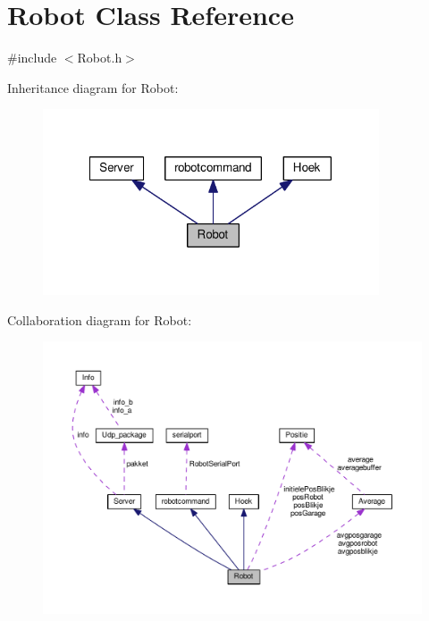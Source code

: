 \hypertarget{classRobot}{\section{Robot Class Reference}
\label{classRobot}
}


{\ttfamily \#include $<$Robot.\-h$>$}



Inheritance diagram for Robot\-:
\nopagebreak
\begin{figure}[H]
\begin{center}
\leavevmode
\includegraphics[width=282pt]{classRobot__inherit__graph}
\end{center}
\end{figure}


Collaboration diagram for Robot\-:
\nopagebreak
\begin{figure}[H]
\begin{center}
\leavevmode
\includegraphics[width=350pt]{classRobot__coll__graph}
\end{center}
\end{figure}
